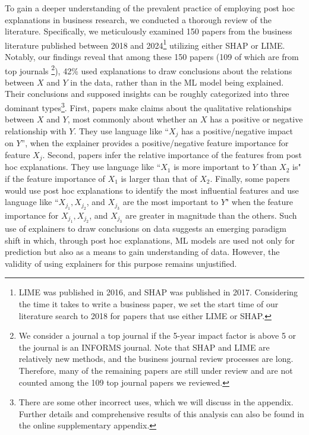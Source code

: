 \documentclass[12pt]{article}  %
\begin{document}
To gain a deeper understanding of the prevalent practice of employing post hoc explanations in business research, we conducted a thorough review of the literature. Specifically, we meticulously examined 150 papers from the business literature published between 2018 and 2024\footnote{LIME was published in 2016, and SHAP was published in 2017. Considering the time it takes to write a business paper, we set the start time of our literature search to 2018 for papers that use either LIME or SHAP.} utilizing either SHAP or LIME. Notably, our findings reveal that among these 150 papers (109 of which are from top journals \footnote{We consider a journal a top journal if the 5-year impact factor is above 5 or the journal is an INFORMS journal. Note that SHAP and LIME are relatively new methods, and the business journal review processes are long. Therefore, many of the remaining papers are still under review and are not counted among the 109 top journal papers we reviewed.}), 42\% used explanations to draw conclusions about the relations between $X$ and $Y$ in the data, rather than in the ML model being explained. Their conclusions and supposed insights can be roughly categorized into three dominant types\footnote{There are some other incorrect uses, which we will discuss in the appendix. Further details and comprehensive results of this analysis can also be found in the online supplementary  appendix.}. First, papers make claims about the qualitative relationships between $X$ and $Y$, most commonly about whether an $X$ has a positive or negative relationship with $Y$. They use language like ``$X_j$ has a positive/negative impact on $Y$'', when the explainer provides a positive/negative feature importance for feature $X_j$. Second, papers infer the relative importance of the features from post hoc explanations. They use language like ``$X_1$ is more important to $Y$ than $X_2$ is" if the feature importance of $X_1$ is larger than that of $X_2$. Finally, some papers would use post hoc explanations to identify the most influential features and use language like ``$X_{j_1}, X_{j_2}$, and $X_{j_3}$ are the most important to $Y$" when the feature importance for $X_{j_1}, X_{j_2}$, and $X_{j_3}$ are greater in magnitude than the others. 
Such use of explainers to draw conclusions on data suggests an emerging paradigm shift in which, through post hoc explanations, ML models are used not only for prediction but also as a means to gain understanding of data. However, the validity of using explainers for this purpose remains unjustified. 
\end{document}

